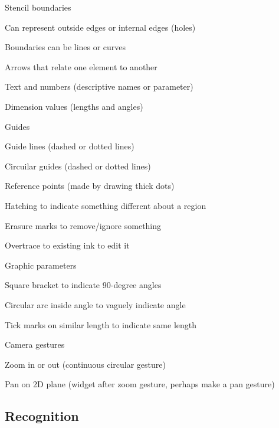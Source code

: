 \documentclass[12pt]{article}
\newenvironment{packed_enum}{
\begin{enumerate}
  \setlength{\itemsep}{1pt}
  \setlength{\parskip}{0pt}
  \setlength{\parsep}{0pt}
}{\end{enumerate}}
\begin{document}
\begin{packed_enum}
\item Stencil boundaries
  \begin{packed_enum}
  \item Can represent outside edges or internal edges (holes)
  \item Boundaries can be lines or curves
  \end{packed_enum}
\item Arrows that relate one element to another
\item Text and numbers (descriptive names or parameter)
\item Dimension values (lengths and angles)
\item Guides
  \begin{packed_enum}
  \item Guide lines (dashed or dotted lines)
  \item Circuilar guides (dashed or dotted lines)
  \item Reference points (made by drawing thick dots)
  \end{packed_enum}
\item Hatching to indicate something different about a region
\item Erasure marks to remove/ignore something
\item Overtrace to existing ink to edit it
\item Graphic parameters
  \begin{packed_enum}
  \item Square bracket to indicate 90-degree angles
  \item Circular arc inside angle to vaguely indicate angle
  \item Tick marks on similar length to indicate same length
  \end{packed_enum}
\item Camera gestures
  \begin{packed_enum}
  \item Zoom in or out (continuous circular gesture)
  \item Pan on 2D plane (widget after zoom gesture, perhaps make a pan gesture)
  \end{packed_enum}
\end{packed_enum}

\subsection{Recognition}
\end{document}
